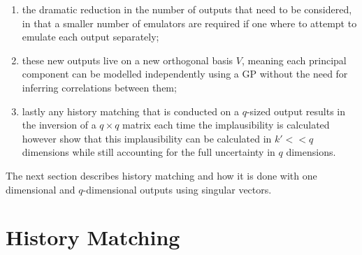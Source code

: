 \documentclass{article}
\newcommand{\numOutputs}{q}
\newcommand{\basis}{V}
\newcommand{\matRank}{k}
\begin{document}
\begin{enumerate}
    \item the dramatic reduction in the number of outputs that need to be considered, in that a smaller number of emulators are required if one where to attempt to emulate each output separately;

    \item these new outputs live on a new orthogonal basis $\basis$, meaning each principal component can be modelled independently using a GP \citep{Higdon2008} without the need for inferring correlations between them;

    \item lastly any history matching that is conducted on a $\numOutputs$-sized output results in the inversion of a $\numOutputs \times \numOutputs$ matrix each time the implausibility is calculated however \citet{Salter2022} show that this implausibility can be calculated in $\matRank' << \numOutputs$ dimensions while still accounting for the full uncertainty in $\numOutputs$ dimensions.
\end{enumerate}
The next section describes history matching and how it is done with one dimensional and $\numOutputs$-dimensional outputs using singular vectors.
\section{History Matching}
\label{section:hm}
\end{document}
